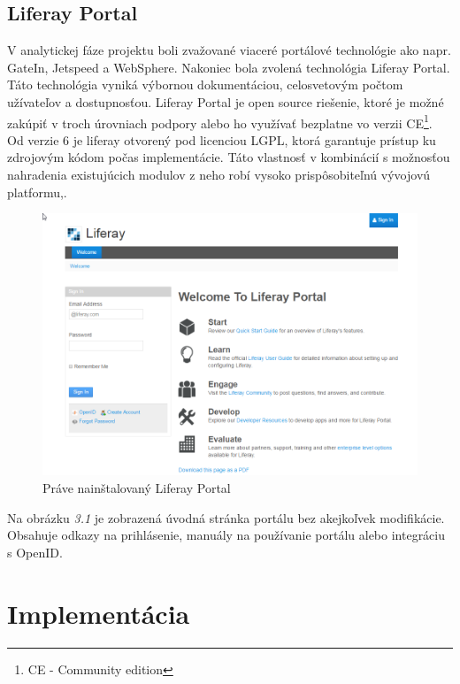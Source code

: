 \documentclass[
  print, %
  table,   %
  lof,     %
  nolot,     %
]{fithesis3}
\begin{document}
\section{Liferay Portal}
V analytickej fáze projektu boli zvažované viaceré portálové technológie ako napr. GateIn, Jetspeed a WebSphere. Nakoniec bola zvolená technológia Liferay Portal. Táto technológia vyniká výbornou dokumentáciou, celosvetovým počtom užívateľov a dostupnosťou. Liferay Portal je open source riešenie, ktoré je možné zakúpiť v troch úrovniach podpory alebo ho využívať bezplatne vo verzii CE\footnote{CE - Community edition}. Od verzie 6 je liferay otvorený pod licenciou LGPL, ktorá garantuje prístup ku zdrojovým kódom počas implementácie. Táto vlastnosť v kombinácií s možnosťou nahradenia existujúcich modulov z neho robí vysoko prispôsobiteľnú vývojovú platformu\cite{yuan-interface},\cite{yuan-build}.
\clearpage
\begin{figure}[H]
	\centering
		\includegraphics[width=\textwidth]{fithesis/obr/liferayUvod.png}	
	\caption{Práve nainštalovaný Liferay Portal}
	\label{liferayUvod}
\end{figure}
\noindent Na obrázku \textit{3.1} je zobrazená úvodná stránka portálu bez akejkoľvek modifikácie. Obsahuje odkazy na prihlásenie, manuály na používanie portálu alebo integráciu s OpenID.
\chapter{Implementácia}
\end{document}
